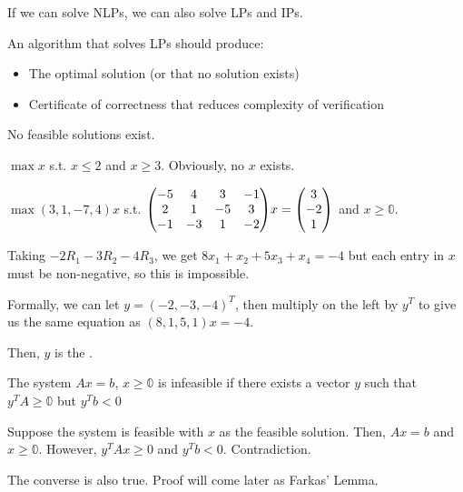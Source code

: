 \documentclass[class=co250,tikz,notes]{agony}
\begin{document}
If we can solve NLPs, we can also solve LPs and IPs.

An algorithm that solves LPs should produce:
\begin{itemize}[nosep]
  \item The optimal solution (or that no solution exists)
  \item Certificate of correctness that reduces complexity of verification
\end{itemize}

\begin{defn}[infeasibility]
  No feasible solutions exist.
\end{defn}

\begin{example}
  $\max x$ s.t. $x \leq 2$ and $x \geq 3$. Obviously, no $x$ exists.
\end{example}

\begin{example}
  $\max{(3,1,-7,4)x}$ s.t. $\mqty(-5&4&3&-1\\2&1&-5&3\\-1&-3&1&-2)x = \mqty(3\\-2\\1)$ and $x \geq \mathbb{0}$.

  Taking $-2R_1 - 3R_2 - 4R_3$, we get $8x_1+x_2+5x_3+x_4 = -4$ but each entry in $x$ must be non-negative, so this is impossible.

  Formally, we can let $y = (-2,-3,-4)^T$, then multiply on the left by $y^T$ to give us the same equation as $(8,1,5,1)x = -4$.

  Then, $y$ is the .
\end{example}

\begin{prop}
  The system $Ax = b$, $x \geq \mathbb{0}$ is infeasible if there exists a vector $y$ such that $y^T A \geq \mathbb{0}$ but $y^T b < 0$
\end{prop}
\begin{prf}
  Suppose the system is feasible with $x$ as the feasible solution. Then, $Ax = b$ and $x \geq \mathbb{0}$. However, $y^T A x \geq 0$ and $y^T b < 0$. Contradiction.
\end{prf}

The converse is also true. Proof will come later as Farkas' Lemma.
\end{document}
